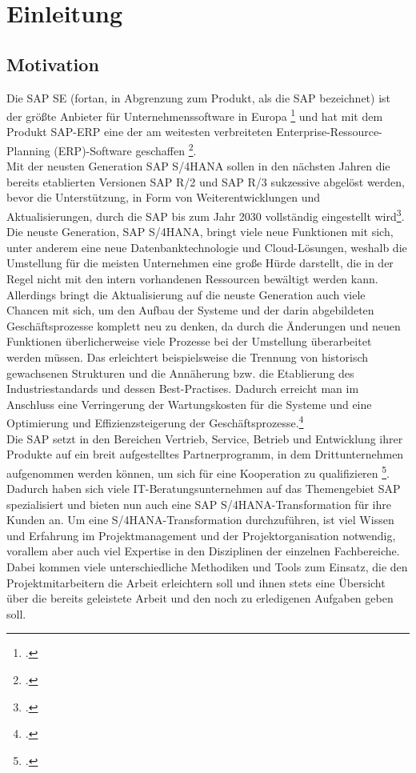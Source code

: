 \section{Einleitung}
\subsection{Motivation}
Die SAP SE (fortan, in Abgrenzung zum Produkt, als \glqq{}die\grqq{} SAP bezeichnet) ist der größte Anbieter für Unternehmenssoftware in Europa \footcite{sap-about} und hat mit dem Produkt SAP-ERP eine der am weitesten verbreiteten Enterprise-Ressource-Planning (ERP)-Software geschaffen \footcite{}. \\Mit der neusten Generation SAP S/4HANA sollen in den nächsten Jahren die bereits etablierten Versionen SAP R/2 und SAP R/3 sukzessive abgelöst werden, bevor die Unterstützung, in Form von Weiterentwicklungen und Aktualisierungen, durch die SAP bis zum Jahr 2030 vollständig eingestellt wird\footcite{sap-support}. Die neuste Generation, SAP S/4HANA, bringt viele neue Funktionen mit sich, unter anderem eine neue Datenbanktechnologie und Cloud-Lösungen, weshalb die Umstellung für die meisten Unternehmen eine große Hürde darstellt, die in der Regel nicht mit den intern vorhandenen Ressourcen bewältigt werden kann. Allerdings bringt die Aktualisierung auf die neuste Generation auch viele Chancen mit sich, um den Aufbau der Systeme und der darin abgebildeten Geschäftsprozesse komplett neu zu denken, da durch die Änderungen und neuen Funktionen überlicherweise viele Prozesse bei der Umstellung überarbeitet werden müssen. Das erleichtert beispielsweise die Trennung von historisch gewachsenen Strukturen und die Annäherung bzw. die Etablierung des Industriestandards und dessen Best-Practises. Dadurch erreicht man im Anschluss eine Verringerung der Wartungskosten für die Systeme und eine Optimierung und Effizienzsteigerung der Geschäftsprozesse.\footcite{}\\ 
Die SAP setzt in den Bereichen Vertrieb, Service, Betrieb und  Entwicklung ihrer Produkte auf ein breit aufgestelltes Partnerprogramm, in dem Drittunternehmen aufgenommen werden können, um sich für eine Kooperation zu qualifizieren \footcite{sap-partner}. Dadurch haben sich viele IT-Beratungsunternehmen auf das Themengebiet SAP spezialisiert und bieten nun auch eine SAP S/4HANA-Transformation für ihre Kunden an. Um eine S/4HANA-Transformation durchzuführen, ist viel Wissen und Erfahrung im Projektmanagement und der Projektorganisation notwendig, vorallem aber auch viel Expertise in den Disziplinen der einzelnen Fachbereiche. Dabei kommen viele unterschiedliche Methodiken und Tools zum Einsatz, die den Projektmitarbeitern die Arbeit erleichtern soll und ihnen stets eine Übersicht über die bereits geleistete Arbeit und den noch zu erledigenen Aufgaben geben soll. 

